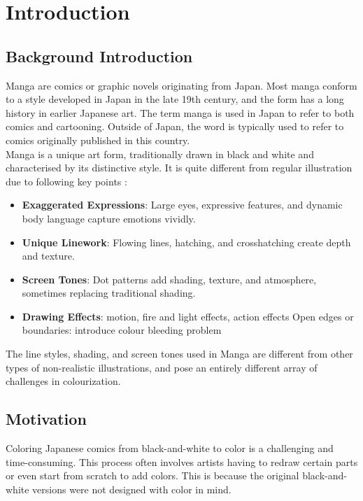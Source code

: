 \chapter{Introduction}
\section{Background Introduction}
Manga are comics or graphic novels originating from Japan. Most manga conform to a style developed in Japan in the late 19th century, and the form has a long history in earlier Japanese art. The term manga is used in Japan to refer to both comics and cartooning. Outside of Japan, the word is typically used to refer to comics originally published in this country.\\

\noindent 
Manga is a unique art form, traditionally drawn in black and white and characterised by its distinctive style. It is quite different from regular illustration \cite{li-2017-deep}due to following key points :

\begin{itemize}
    \item \textbf{Exaggerated Expressions}: Large eyes, expressive features, and dynamic body language capture emotions vividly.
    \item \textbf{Unique Linework}: Flowing lines, hatching, and crosshatching create depth and texture.
    \item \textbf{Screen Tones}: Dot patterns add shading, texture, and atmosphere, sometimes replacing traditional shading.
    \item \textbf{Drawing Effects}: motion, fire and light effects, action effects
    Open edges or boundaries: introduce colour bleeding problem
    
\end{itemize}

\noindent The line styles, shading, and screen tones used in Manga are different from other types of non-realistic illustrations, and pose an entirely different array of challenges in colourization.

\section{Motivation}
Coloring Japanese comics from black-and-white to color is a challenging and time-consuming. This process often involves artists having to redraw certain parts or even start from scratch to add colors. This is because the original black-and-white versions were not designed with color in mind. \\ 

